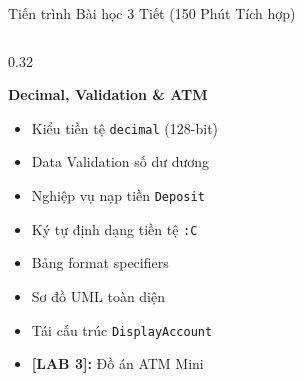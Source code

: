 \documentclass[aspectratio=169, 10pt]{beamer}
\begin{document}
\begin{frame}{Tiến trình Bài học 3 Tiết (150 Phút Tích hợp)}
\begin{columns}[T]
    \begin{column}{0.32\textwidth}
      \begin{tcolorbox}[colback=UniGreen!10,colframe=UniGreen,title=\textbf{TIẾT 3 (50')},fonttitle=\small\bfseries]
        \textbf{Decimal, Validation \& ATM}
        \begin{itemize}\footnotesize
          \item Kiểu tiền tệ \texttt{decimal} (128-bit)
          \item Data Validation số dư dương
          \item Nghiệp vụ nạp tiền \texttt{Deposit}
          \item Ký tự định dạng tiền tệ \texttt{:C}
          \item Bảng format specifiers
          \item Sơ đồ UML toàn diện
          \item Tái cấu trúc \texttt{DisplayAccount}
          \item \textbf{[LAB 3]:} Đồ án ATM Mini
        \end{itemize}
      \end{tcolorbox}
    \end{column}
  \end{columns}
\end{frame}
\end{document}
